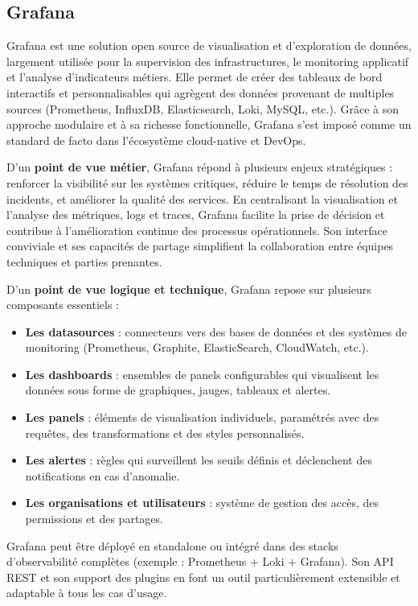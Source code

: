 \subsection{Grafana}

Grafana est une solution open source de visualisation et d’exploration de données, largement utilisée pour la supervision des infrastructures, le monitoring applicatif et l’analyse d’indicateurs métiers. Elle permet de créer des tableaux de bord interactifs et personnalisables qui agrègent des données provenant de multiples sources (Prometheus, InfluxDB, Elasticsearch, Loki, MySQL, etc.). Grâce à son approche modulaire et à sa richesse fonctionnelle, Grafana s’est imposé comme un standard de facto dans l’écosystème cloud-native et DevOps.

D’un \textbf{point de vue métier}, Grafana répond à plusieurs enjeux stratégiques  : renforcer la visibilité sur les systèmes critiques, réduire le temps de résolution des incidents, et améliorer la qualité des services. En centralisant la visualisation et l’analyse des métriques, logs et traces, Grafana facilite la prise de décision et contribue à l’amélioration continue des processus opérationnels. Son interface conviviale et ses capacités de partage simplifient la collaboration entre équipes techniques et parties prenantes.

D’un \textbf{point de vue logique et technique}, Grafana repose sur plusieurs composants essentiels  :
\begin{itemize}
	\item \textbf{Les datasources}  : connecteurs vers des bases de données et des systèmes de monitoring (Prometheus, Graphite, ElasticSearch, CloudWatch, etc.).
	\item \textbf{Les dashboards}  : ensembles de panels configurables qui visualisent les données sous forme de graphiques, jauges, tableaux et alertes.
	\item \textbf{Les panels}  : éléments de visualisation individuels, paramétrés avec des requêtes, des transformations et des styles personnalisés.
	\item \textbf{Les alertes}  : règles qui surveillent les seuils définis et déclenchent des notifications en cas d’anomalie.
	\item \textbf{Les organisations et utilisateurs}  : système de gestion des accès, des permissions et des partages.
\end{itemize}

Grafana peut être déployé en standalone ou intégré dans des stacks d’observabilité complètes (exemple  : Prometheus + Loki + Grafana). Son API REST et son support des plugins en font un outil particulièrement extensible et adaptable à tous les cas d’usage.

